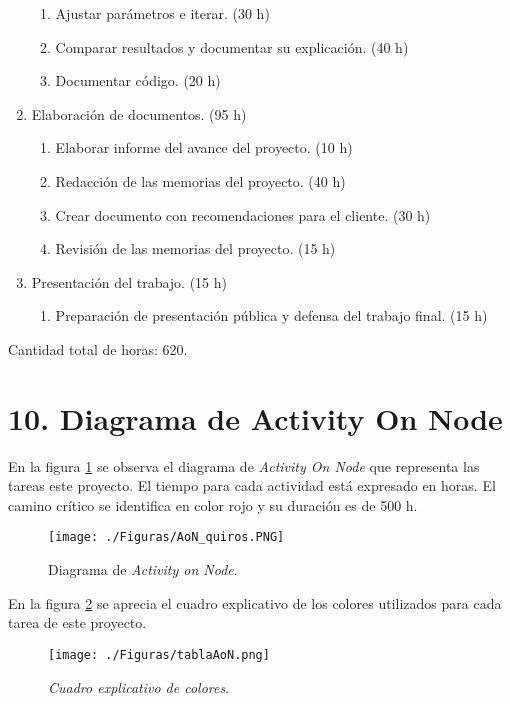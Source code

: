 \documentclass[
11pt, %
]{charter}
\begin{document}
\begin{enumerate}
\begin{enumerate}
	\item Ajustar parámetros e iterar. (30 h)
	\item Comparar resultados y documentar su explicación. (40 h)
	\item Documentar código. (20 h)
	\end{enumerate}
\item Elaboración de documentos. (95 h)
	\begin{enumerate}
	\item Elaborar informe del avance del proyecto. (10 h)
	\item Redacción de las memorias del proyecto. (40 h)
	\item Crear documento con recomendaciones para el cliente. (30 h)
	\item Revisión de las memorias del proyecto. (15 h)
	\end{enumerate}
\item Presentación del trabajo. (15 h)
  \begin{enumerate}
  \item Preparación de presentación pública y defensa del trabajo final. (15 h) 
  \end{enumerate}
\end{enumerate}

Cantidad total de horas: 620.


\section{10. Diagrama de Activity On Node}
\label{sec:AoN}
En la figura \ref{fig:AoN} se observa el diagrama de \textit{Activity On Node} que representa las tareas este proyecto. El tiempo para cada 
actividad está expresado en horas. El camino crítico se identifica en color rojo y su duración es de 500 h.

\begin{figure}[htpb]
\centering 
\texttt{[image: ./Figuras/AoN\_quiros.PNG]}
\caption{Diagrama de \textit{Activity on Node}.}
\label{fig:AoN}
\end{figure}
\pagebreak

En la figura \ref{fig:tablaAoN} se aprecia el cuadro explicativo de los colores utilizados para cada tarea de este proyecto.
\begin{figure}[htpb]
  \centering 
  \texttt{[image: ./Figuras/tablaAoN.png]}
  \caption{\textit{Cuadro explicativo de colores}.}
  \label{fig:tablaAoN}
\end{figure}
\end{document}
